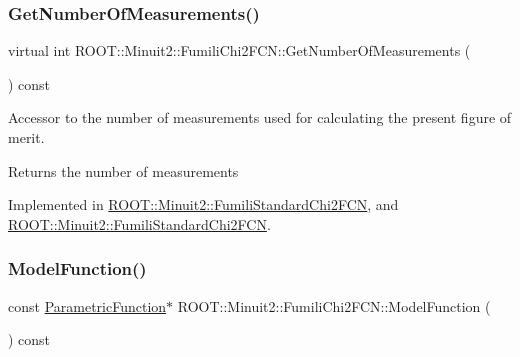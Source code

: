 \mbox{\label{classROOT_1_1Minuit2_1_1FumiliChi2FCN_afa1acb8484d1c1825de0dd641e301717}} 
\subsubsection{\texorpdfstring{GetNumberOfMeasurements()}{GetNumberOfMeasurements()}\hspace{0.1cm}{\footnotesize\ttfamily [2/2]}}
{\footnotesize\ttfamily virtual int R\+O\+O\+T\+::\+Minuit2\+::\+Fumili\+Chi2\+F\+C\+N\+::\+Get\+Number\+Of\+Measurements (\begin{DoxyParamCaption}{ }\end{DoxyParamCaption}) const\hspace{0.3cm}{\ttfamily [pure virtual]}}

Accessor to the number of measurements used for calculating the present figure of merit.

\begin{DoxyReturn}{Returns}
the number of measurements 
\end{DoxyReturn}


Implemented in \mbox{\hyperlink{classROOT_1_1Minuit2_1_1FumiliStandardChi2FCN_a27414beb35c9c18156e6b3781aaf587f}{R\+O\+O\+T\+::\+Minuit2\+::\+Fumili\+Standard\+Chi2\+F\+CN}}, and \mbox{\hyperlink{classROOT_1_1Minuit2_1_1FumiliStandardChi2FCN_a868b7c1aa7d2597db475ca99799c9131}{R\+O\+O\+T\+::\+Minuit2\+::\+Fumili\+Standard\+Chi2\+F\+CN}}.

\mbox{\label{classROOT_1_1Minuit2_1_1FumiliChi2FCN_a3d31739e476a413e0c5616bb0c6283b9}} 
\subsubsection{\texorpdfstring{ModelFunction()}{ModelFunction()}\hspace{0.1cm}{\footnotesize\ttfamily [1/2]}}
{\footnotesize\ttfamily const \mbox{\hyperlink{classROOT_1_1Minuit2_1_1ParametricFunction}{Parametric\+Function}}$\ast$ R\+O\+O\+T\+::\+Minuit2\+::\+Fumili\+Chi2\+F\+C\+N\+::\+Model\+Function (\begin{DoxyParamCaption}{ }\end{DoxyParamCaption}) const\hspace{0.3cm}{\ttfamily [inline]}}

